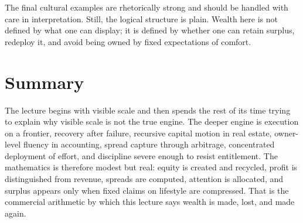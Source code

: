The final cultural examples are rhetorically strong and should be handled with care in interpretation. Still, the logical structure is plain. Wealth here is not defined by what one can display; it is defined by whether one can retain surplus, redeploy it, and avoid being owned by fixed expectations of comfort.

\section{Summary}

The lecture begins with visible scale and then spends the rest of its time trying to explain why visible scale is not the true engine. The deeper engine is execution on a frontier, recovery after failure, recursive capital motion in real estate, owner-level fluency in accounting, spread capture through arbitrage, concentrated deployment of effort, and discipline severe enough to resist entitlement. The mathematics is therefore modest but real: equity is created and recycled, profit is distinguished from revenue, spreads are computed, attention is allocated, and surplus appears only when fixed claims on lifestyle are compressed. That is the commercial arithmetic by which this lecture says wealth is made, lost, and made again.